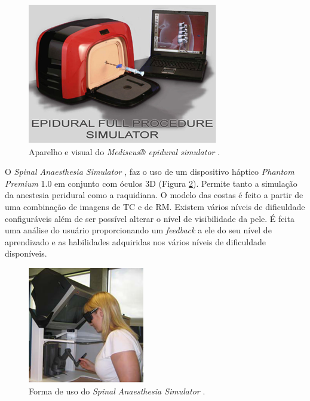 \begin{figure}[ht!]
    \centering
    \includegraphics[width=0.6\linewidth]{capitulos/figuras/mediseusSimulator.png} 
    \caption{Aparelho e visual do \textit{Mediseus® epidural simulator}  \cite{Mayooran2006}.}
    \label{fig:mediseusSimulator}
\end{figure}

O \textit{Spinal Anaesthesia Simulator} \cite{Albert2007,Dreifaldt2006}, faz o uso de um dispositivo háptico \textit{Phantom Premium} 1.0 em conjunto com óculos 3D (Figura \ref{fig:spinalAnestesiaSim}). Permite tanto a simulação da anestesia peridural como a raquidiana. O modelo das costas é feito a partir de uma combinação de imagens de \acrfull{TC} e de \acrshort{RM}. Existem vários níveis de dificuldade configuráveis além de ser possível alterar o nível de visibilidade da pele. É feita uma análise do usuário proporcionando um \textit{feedback} a ele do seu nível de aprendizado e as habilidades adquiridas nos vários níveis de dificuldade disponíveis.

\begin{figure}[ht!]
    \centering
    \includegraphics[width=0.3\linewidth]{capitulos/figuras/spinalAnestesiaSim.png} 
    \caption{Forma de uso do \textit{Spinal Anaesthesia Simulator}  \cite{Dreifaldt2006}.}
    \label{fig:spinalAnestesiaSim}
\end{figure}

